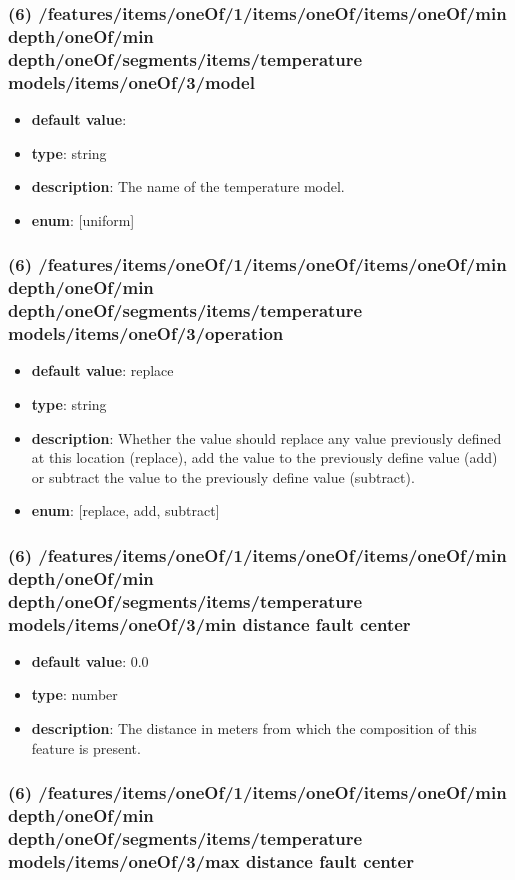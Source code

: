 \subsubsection{(6) /features/items/oneOf/1/items/oneOf/items/oneOf/min depth/oneOf/min depth/oneOf/segments/items/temperature models/items/oneOf/3/model}
\begin{itemize}[leftmargin=6em]\item {\bf default value}: 
\item {\bf type}: string
\item {\bf description}: The name of the temperature model.
\item {\bf enum}: [uniform]\end{itemize}\subsubsection{(6) /features/items/oneOf/1/items/oneOf/items/oneOf/min depth/oneOf/min depth/oneOf/segments/items/temperature models/items/oneOf/3/operation}
\begin{itemize}[leftmargin=6em]\item {\bf default value}: replace
\item {\bf type}: string
\item {\bf description}: Whether the value should replace any value previously defined at this location (replace), add the value to the previously define value (add) or subtract the value to the previously define value (subtract).
\item {\bf enum}: [replace, add, subtract]\end{itemize}\subsubsection{(6) /features/items/oneOf/1/items/oneOf/items/oneOf/min depth/oneOf/min depth/oneOf/segments/items/temperature models/items/oneOf/3/min distance fault center}
\begin{itemize}[leftmargin=6em]\item {\bf default value}: 0.0
\item {\bf type}: number
\item {\bf description}: The distance in meters from which the composition of this feature is present.
\end{itemize}\subsubsection{(6) /features/items/oneOf/1/items/oneOf/items/oneOf/min depth/oneOf/min depth/oneOf/segments/items/temperature models/items/oneOf/3/max distance fault center}
